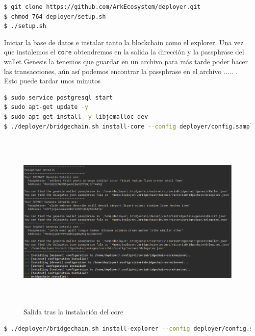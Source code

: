 \begin{lstlisting}[language=Bash,caption=Instalación Blockchain. Parte IX, label=cod:suma-cuerpo, style=Consola]
$ git clone https://github.com/ArkEcosystem/deployer.git
$ chmod 764 deployer/setup.sh
$ ./setup.sh
\end{lstlisting}

Iniciar la base de datos e instalar tanto la blockchain como el explorer. Una vez que instalemos el \texttt{core} obtendremos en la salida la dirección y la passphrase del wallet Genesis la tenemos que guardar en un archivo para más tarde poder hacer las transacciones, aún así podemos encontrar la passphrase en el archivo ..... . Esto puede tardar unos minutos
\begin{lstlisting}[language=Bash,caption=Instalación Blockchain. Parte X, label=cod:suma-cuerpo, style=Consola]
$ sudo service postgresql start
$ sudo apt-get update -y 
$ sudo apt-get install -y libjemalloc-dev
$ ./deployer/bridgechain.sh install-core --config deployer/config.sample.conf --autoinstall-deps --non-interactive
\end{lstlisting}

\begin{figure}[h]
	\centering
	\includegraphics[width=15cm,height=9cm]{figuras/Instalacion_bridgechain.png}
	\caption{Salida tras la instalación del core}
	\label{fig:install-bridge}
\end{figure}

\begin{lstlisting}[language=Bash,caption=Instalación Blockchain. Parte X, label=cod:suma-cuerpo, style=Consola]
$ ./deployer/bridgechain.sh install-explorer --config deployer/config.sample.conf --skip-deps --non-interactive
\end{lstlisting}



